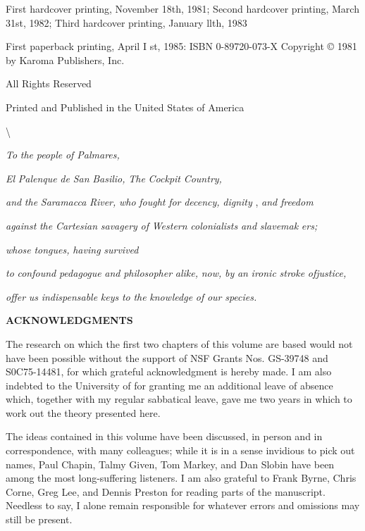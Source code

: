 
First hardcover printing, November 18th, 1981; Second hardcover printing, March 31st, 1982; Third hardcover printing, January llth, 1983

First paperback printing, April I st, 1985: ISBN 0-89720-073-X Copyright © 1981 by Karoma Publishers, Inc.

All Rights Reserved

Printed and Published in the United States of America

{\textbackslash}

\textit{To} \textit{the} \textit{people} \textit{of Palmares,}

\textit{El} \textit{Palenque} \textit{d}\textit{e} \textit{San} \textit{Basilio,} \textit{The} \textit{Cockpit} \textit{Country,}

\textit{and} \textit{the} \textit{Saramacca} \textit{River,} \textit{who} \textit{fought} \textit{for} \textit{decency,} \textit{dignity} , \textit{and} \textit{freedom}

\textit{against} \textit{the} \textit{Cartesian} \textit{savagery} \textit{of} \textit{Western} \textit{colonialists} \textit{and} \textit{slavemak} \textit{ers;}

\textit{whose} \textit{tongues,} \textit{having} \textit{survived}

\textit{to} \textit{confound} \textit{pedagogue} \textit{and} \textit{philosopher} \textit{alike,} \textit{now,} \textit{by} \textit{an} \textit{ironic} \textit{stroke} \textit{ofjustice,}

\textit{offer} \textit{us} \textit{indispensable} \textit{keys} \textit{to} \textit{the} \textit{knowledge} \textit{of} \textit{our} \textit{species.}

\bfseries
\hypertarget{TOC250001}{}ACKNOWLEDGMENTS

The research on which the first two chapters of this volume are based would not have been possible without the support of NSF Grants Nos. GS-39748 and S0C75-14481, for which grateful acknowledgment is hereby made. I am also indebted to the University of  for granting me an additional leave of absence which, together with my regular sabbatical leave, gave me two years in which to work out the theory presented here.

The ideas contained in this volume have been discussed, in person and in correspondence, with many colleagues; while it is in a sense in\-vidious to pick out names, Paul Chapin, Talmy Given, Tom Markey, and Dan Slobin have been among the most long-suffering listeners. I am also grateful to Frank Byrne, Chris Corne, Greg Lee, and Dennis Pres\-ton for reading parts of the manuscript. Needless to say, I alone remain responsible for whatever errors and omissions may still be present.

